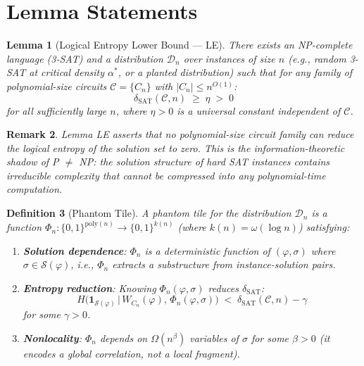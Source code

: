 \documentclass[11pt]{article}
\newtheorem{lemma}{Lemma}
\newtheorem{definition}[lemma]{Definition}
\newtheorem{remark}[lemma]{Remark}
\theoremstyle{definition}
\begin{document}
\section{Lemma Statements}

\begin{lemma}[Logical Entropy Lower Bound --- LE]
\label{lem:LE}
There exists an NP-complete language (3-SAT) and a distribution $\mathcal{D}_n$ over instances
of size $n$ (e.g., random 3-SAT at critical density $\alpha^*$, or a planted distribution)
such that for any family of polynomial-size circuits $\mathcal{C} = \{C_n\}$ with $|C_n| \leq n^{O(1)}$:
\[
  \delta_{\mathrm{SAT}}(\mathcal{C}, n) \;\geq\; \eta \;>\; 0
\]
for all sufficiently large $n$, where $\eta > 0$ is a universal constant independent of $\mathcal{C}$.
\end{lemma}

\begin{remark}
Lemma LE asserts that no polynomial-size circuit family can reduce the logical entropy
of the solution set to zero.  This is the information-theoretic shadow of P $\neq$ NP:
the solution structure of hard SAT instances contains irreducible complexity that
cannot be compressed into any polynomial-time computation.
\end{remark}

\begin{definition}[Phantom Tile]
\label{def:phantom}
A \emph{phantom tile} for the distribution $\mathcal{D}_n$ is a function
$\Phi_n : \{0,1\}^{\mathrm{poly}(n)} \to \{0,1\}^{k(n)}$ (where $k(n) = \omega(\log n)$)
satisfying:
\begin{enumerate}
  \item \textbf{Solution dependence}: $\Phi_n$ is a deterministic function of $(\varphi, \sigma)$
    where $\sigma \in \mathcal{S}(\varphi)$, i.e., $\Phi_n$ extracts a substructure from
    instance-solution pairs.
  \item \textbf{Entropy reduction}: Knowing $\Phi_n(\varphi, \sigma)$ reduces $\delta_{\mathrm{SAT}}$:
    \[
      H\bigl(\mathbf{1}_{\mathcal{S}(\varphi)} \,\big|\, W_{C_n}(\varphi),\, \Phi_n(\varphi, \sigma)\bigr)
      \;<\; \delta_{\mathrm{SAT}}(\mathcal{C}, n) - \gamma
    \]
    for some $\gamma > 0$.
  \item \textbf{Nonlocality}: $\Phi_n$ depends on $\Omega(n^\beta)$ variables of $\sigma$
    for some $\beta > 0$ (it encodes a global correlation, not a local fragment).
\end{enumerate}
\end{definition}
\end{document}
